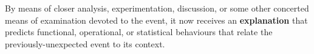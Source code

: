 


\begin{defn}\label{def:explanation}
\hypertarget{def:explanation}{}By means of closer analysis,
experimentation, discussion, or some other concerted means of
examination devoted to the event, it now receives an
\textbf{explanation} that predicts functional, operational, or
statistical behaviours that relate the previously-unexpected event to
its context.
\end{defn}
                                         
